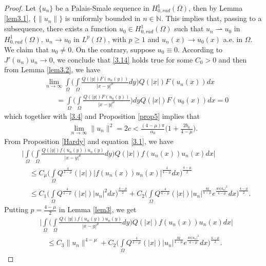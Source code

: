 \documentclass[11pt]{amsart}
\numberwithin{equation}{section}
\newcommand{\hr}{H^1_{0, rad}(\Omega)}
\newcommand{\1}{\frac{1}{2}}
\begin{document}
	\begin{proof}
		Let $\{u_n\}$ be a Palais-Smale sequence in $\hr$, then by Lemma \ref{lem3.1}, $\{ \|u_n\|\}$ is uniformly bounded in $n\in \mathbb{N}$.  This implies that, passing to a subsequence, there exists a function $u_0\in \hr$ such that $u_n \rightharpoonup u_0$ in $\hr$, $u_n \rightarrow u_0$ in $L^p(\Omega)$, with $p \geq 1$ and $u_n(x) \rightarrow u_0(x)$ a.e. in $\Omega$.\\
		We claim that $u_0\neq0$. On the contrary, suppose $u_0 \equiv 0$. According to $J'(u_n)u_n \rightarrow 0$, we conclude that \eqref{3.14} holds true for some $C_0>0$ and then from Lemma \ref{lem3.2}, we have
		\begin{align}
			&\lim_{n\rightarrow \infty} \int\limits_\Omega \Big( \int\limits_\Omega \frac{Q(|y|)F(u_n(y))}{|x-y|^\mu}dy\Big)Q(|x|) F(u_n(x))dx \nonumber\\
			& \quad \ \ \ = \int\limits_\Omega \Big( \int\limits_\Omega \frac{Q(|y|)F(u_0(y))}{|x-y|^\mu}\Big)dy Q(|x|) F(u_0(x))dx=0 \label{4.9}
		\end{align}
		which together with \eqref{3.4} and Proposition \ref{prop5} implies that 
		\begin{align}
			\label{4.10}
			\lim_{n\rightarrow \infty} \|u_n\|^2 = 2c < \frac{(4-\mu)\pi}{\alpha_0} \Big( 1+\frac{2b_0}{4-\mu}\Big).
		\end{align}
		From Proposition \ref{Hardy} and equation \eqref{3.1}, we have
		\begin{align}
			&\Bigg| \int\limits_\Omega \Bigg( \int\limits_\Omega \frac{Q(|y|)f(u_n(y))u_n(y)}{|x-y|^\mu}dy \Bigg) Q(|x|) f(u_n(x)) u_n(x) dx\Bigg|\nonumber\\
			& \quad \leq C_\mu \Bigg( \int\limits_\Omega Q^{\frac{4}{4-\mu}}(|x|) |f(u_n(x)) u_n(x)|^{\frac{4}{4-\mu}}dx\Bigg)^{\frac{4-\mu}{2}}\nonumber\\
			& \quad \leq C_1 \Bigg( \int\limits_\Omega Q^{\frac{4}{4-\mu}}(|x|) |u_n|^2dx\Bigg)^\frac{4-\mu}{2} + C_2 \Bigg( \int\limits_\Omega Q^{\frac{4}{4-\mu}}(|x|) |u_n|^{\frac{4q}{4-\mu}} e^{\frac{4\alpha |u_n|^2}{4-\mu}} dx\Bigg)^{\frac{4-\mu}{2}}.\nonumber
		\end{align}
		Putting $p=\frac{4-\mu}{2}$ in Lemma \ref{lem3}, we get
		\begin{align}
			\label{4.11}
			&\Bigg| \int\limits_\Omega \Bigg( \int\limits_\Omega \frac{Q(|y|)f(u_n(y))u_n(y)}{|x-y|^\mu}dy \Bigg) Q(|x|) f(u_n(x)) u_n(x) dx\Bigg|\nonumber\\
			& \quad \leq C_3 \|u_n\|^{4-\mu} + C_2 \Bigg(\int\limits_\Omega Q^{\frac{4}{4-\mu}}(|x|) |u_n|^{\frac{4q}{4-\mu}} e^{\frac{4\alpha |u_n|^2}{4-\mu}}dx \Bigg)^{\frac{4-\mu}{2}}. 

\end{align}
\end{proof}
\end{document}
